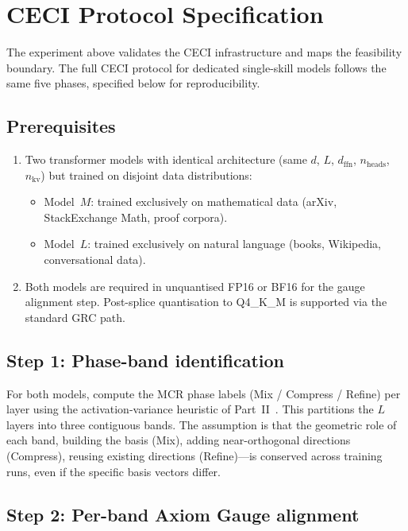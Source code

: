 \documentclass[11pt]{article}
\begin{document}
\section{CECI Protocol Specification}
\label{sec:protocol}

The experiment above validates the CECI infrastructure and maps the
feasibility boundary. The full CECI protocol for dedicated single-skill
models follows the same five phases, specified below for reproducibility.

\subsection{Prerequisites}

\begin{enumerate}
\item Two transformer models with identical architecture (same $d$,
 $L$, $d_\mathrm{ffn}$, $n_\mathrm{heads}$, $n_\mathrm{kv}$)
 but trained on disjoint data distributions:
 \begin{itemize}
 \item Model~$M$: trained exclusively on mathematical data
 (arXiv, StackExchange Math, proof corpora).
 \item Model~$L$: trained exclusively on natural language
 (books, Wikipedia, conversational data).
 \end{itemize}
\item Both models are required in unquantised FP16 or BF16 for the
 gauge alignment step. Post-splice quantisation to Q4\_K\_M is
 supported via the standard GRC path.
\end{enumerate}

\subsection{Step 1: Phase-band identification}

For both models, compute the MCR phase labels (Mix / Compress /
Refine) per layer using the activation-variance heuristic of
Part~II~\cite{stewart2026gp}. This partitions the $L$ layers into
three contiguous bands. The assumption is that the geometric role of
each band, building the basis (Mix), adding near-orthogonal directions
(Compress), reusing existing directions (Refine)---is conserved across
training runs, even if the specific basis vectors differ.

\subsection{Step 2: Per-band Axiom Gauge alignment}
\end{document}
